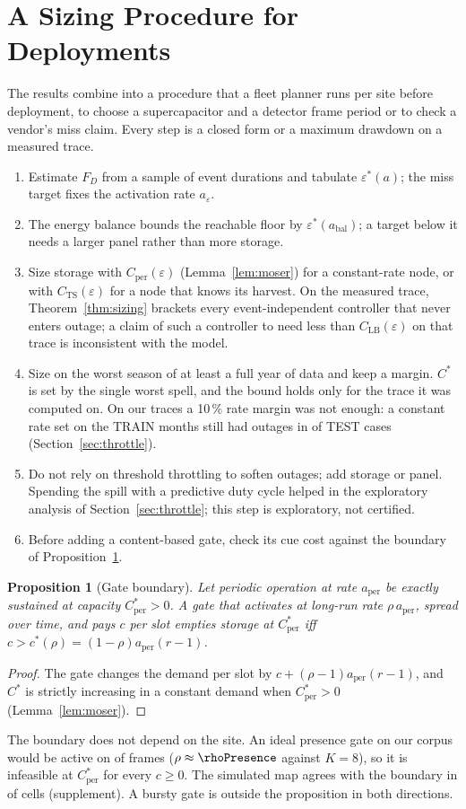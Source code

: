 \documentclass[lettersize,journal]{IEEEtran}
\newtheorem{proposition}{Proposition}
\theoremstyle{definition}
\theoremstyle{remark}
\newcommand{\eps}{\varepsilon}
\begin{document}
\section{A Sizing Procedure for Deployments}\label{sec:procedure}
The results combine into a procedure that a fleet planner runs per site before deployment, to choose a supercapacitor and a detector frame period or to check a vendor's miss claim. Every step is a closed form or a maximum drawdown on a measured trace.
\begin{enumerate}
\item Estimate $F_D$ from a sample of event durations and tabulate $\eps^*(a)$; the miss target fixes the activation rate $a_\eps$.
\item The energy balance bounds the reachable floor by $\eps^*(a_{\mathrm{bal}})$; a target below it needs a larger panel rather than more storage.
\item Size storage with $C_{\mathrm{per}}(\eps)$ (Lemma~\ref{lem:moser}) for a constant-rate node, or with $C_{\mathrm{TS}}(\eps)$ for a node that knows its harvest. On the measured trace, Theorem~\ref{thm:sizing} brackets every event-independent controller that never enters outage; a claim of such a controller to need less than $C_{\mathrm{LB}}(\eps)$ on that trace is inconsistent with the model.
\item Size on the worst season of at least a full year of data and keep a margin. $C^*$ is set by the single worst spell, and the bound holds only for the trace it was computed on. On our traces a 10\,\% rate margin was not enough: a constant rate set on the TRAIN months still had outages in \ExThreeOutTen{} of TEST cases (Section~\ref{sec:throttle}).
\item Do not rely on threshold throttling to soften outages; add storage or panel. Spending the spill with a predictive duty cycle helped in the exploratory analysis of Section~\ref{sec:throttle}; this step is exploratory, not certified.
\item Before adding a content-based gate, check its cue cost against the boundary of Proposition~\ref{prop:gate}.
\end{enumerate}
\begin{proposition}[Gate boundary]\label{prop:gate}
Let periodic operation at rate $a_{\mathrm{per}}$ be exactly sustained at capacity $C^*_{\mathrm{per}}>0$. A gate that activates at long-run rate $\rho\,a_{\mathrm{per}}$, spread over time, and pays $c$ per slot empties storage at $C^*_{\mathrm{per}}$ iff $c>c^*(\rho)=(1-\rho)a_{\mathrm{per}}(r-1)$.
\end{proposition}
\begin{proof}
The gate changes the demand per slot by $c+(\rho-1)a_{\mathrm{per}}(r-1)$, and $C^*$ is strictly increasing in a constant demand when $C^*_{\mathrm{per}}>0$ (Lemma~\ref{lem:moser}).
\end{proof}
\noindent The boundary does not depend on the site. An ideal presence gate on our corpus would be active on \inEventFrac{} of frames ($\rho\approx\rhoPresence$ against $K=8$), so it is infeasible at $C^*_{\mathrm{per}}$ for every $c\ge0$. The simulated map agrees with the boundary in \nGateAgree{} of \nGate{} cells (supplement). A bursty gate is outside the proposition in both directions.
\end{document}
